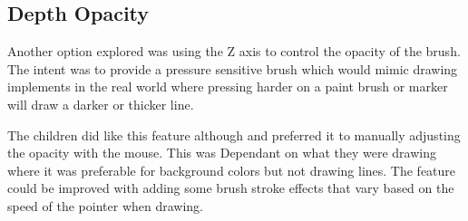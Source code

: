 \subsection{Depth Opacity}

Another option explored was using the Z axis to control the opacity of the brush. The intent was to provide a pressure sensitive brush which would mimic drawing implements in the real world where pressing harder on a paint brush or marker will draw a darker or thicker line. 

The children did like this feature although and preferred it to manually adjusting the opacity with the mouse. This was Dependant on what they were drawing where it was preferable for background colors but not drawing lines. The feature could be improved with adding some brush stroke effects that vary based on the speed of the pointer when drawing. 

